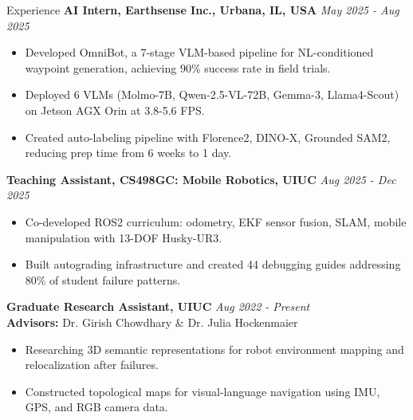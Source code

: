 \documentclass{resume} %
\begin{document}
\begin{rSection}{Experience}
    \textbf{AI Intern, Earthsense Inc., Urbana, IL, USA} \hfill \textit{May 2025 - Aug 2025}
    \vspace{-0.2cm}
    \begin{itemize}[noitemsep,nolistsep]
        \item Developed OmniBot, a 7-stage VLM-based pipeline for NL-conditioned waypoint generation, achieving 90\% success rate in field trials.
        \item Deployed 6 VLMs (Molmo-7B, Qwen-2.5-VL-72B, Gemma-3, Llama4-Scout) on Jetson AGX Orin at 3.8-5.6 FPS.
        \item Created auto-labeling pipeline with Florence2, DINO-X, Grounded SAM2, reducing prep time from 6 weeks to 1 day.
    \end{itemize}

    \textbf{Teaching Assistant, CS498GC: Mobile Robotics, UIUC} \hfill \textit{Aug 2025 - Dec 2025}
    \vspace{-0.2cm}
    \begin{itemize}[noitemsep,nolistsep]
        \item Co-developed ROS2 curriculum: odometry, EKF sensor fusion, SLAM, mobile manipulation with 13-DOF Husky-UR3.
        \item Built autograding infrastructure and created 44 debugging guides addressing 80\% of student failure patterns.
    \end{itemize}

    \textbf{Graduate Research Assistant, UIUC} \hfill \textit{Aug 2022 - Present}
    \\ \textbf{Advisors:} Dr. Girish Chowdhary \& Dr. Julia Hockenmaier
    \vspace{-0.2cm}
    \begin{itemize}[noitemsep,nolistsep]
        \item Researching 3D semantic representations for robot environment mapping and relocalization after failures.
        \item Constructed topological maps for visual-language navigation using IMU, GPS, and RGB camera data.
    \end{itemize}
\end{rSection}

\vspace{-0.2cm}
\end{document}
